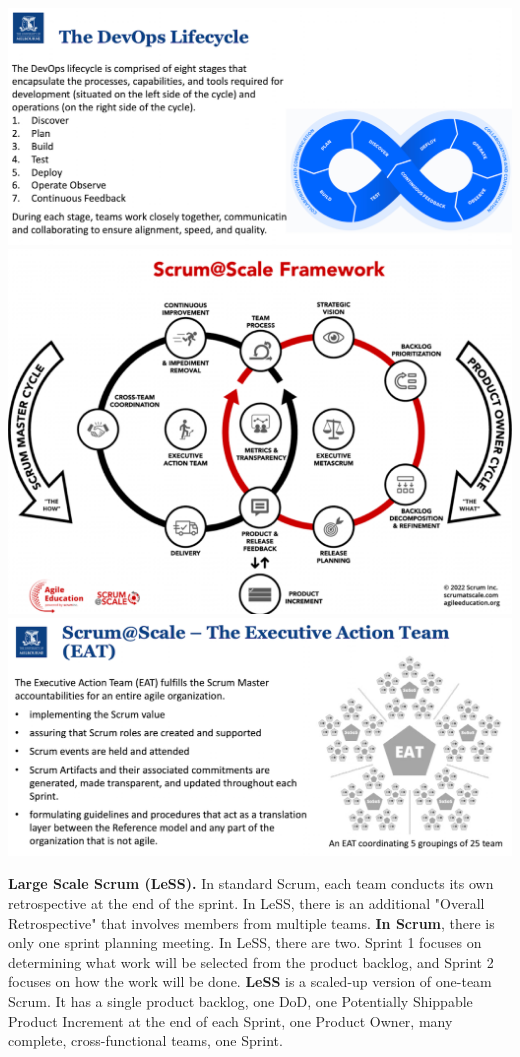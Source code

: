 \includegraphics[width=\linewidth]{figs/SCR-20240606-taig.png}
\includegraphics[width=\linewidth]{figs/SCR-20240606-swrt.png}
\includegraphics[width=\linewidth]{figs/SCR-20240606-szho.png}

\textbf{Large Scale Scrum (LeSS).}
In standard Scrum, each team conducts its own retrospective at the end of the sprint. In LeSS, there is an additional "Overall Retrospective" that involves members from multiple teams. \textbf{In Scrum}, there is only one sprint planning meeting. In LeSS, there are two. Sprint 1 focuses on determining what work will be selected from the product backlog, and Sprint 2 focuses on how the work will be done. \textbf{LeSS} is a scaled-up version of one-team Scrum. It has a single product backlog, one DoD, one Potentially Shippable Product Increment at the end of each Sprint, one Product Owner, many complete, cross-functional teams, one Sprint.


